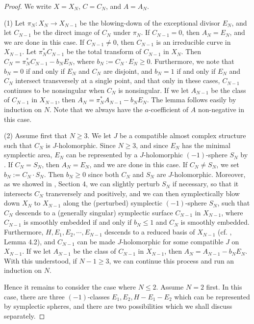 \documentclass[11pt]{amsart}
\theoremstyle{plain}
\numberwithin{theorem}{section}
\theoremstyle{definition}
\begin{document}
\begin{proof}
We write $X=X_N$, $C=C_N$, and $A=A_N$.

(1) Let $\pi_N: X_N\rightarrow X_{N-1}$ be the blowing-down of 
the exceptional divisor $E_N$, and let $C_{N-1}$ be the direct image of $C_N$ under $\pi_N$. If $C_{N-1}=0$, then $A_N=E_N$, and we are done in this case. If $C_{N-1}\neq 0$, then 
$C_{N-1}$ is an irreducible curve in $X_{N-1}$. Let $\pi_N^\ast C_{N-1}$ be the total transform of
$C_{N-1}$ in $X_N$. Then $C_N=\pi_N^\ast C_{N-1}-b_N E_N$, where $b_N:=C_N\cdot E_N\geq 0$.
Furthermore, we note that $b_N=0$ if and only if $E_N$ and $C_N$ are disjoint, and $b_N=1$ if and only if $E_N$ and $C_N$ intersect transversely at a single point, and that only in these cases,
$C_{N-1}$ continues to be nonsingular when $C_N$ is nonsingular. If we let $A_{N-1}$ be the class of $C_{N-1}$
in $X_{N-1}$, then $A_N=\pi_N^\ast A_{N-1}-b_N E_N$. The lemma follows easily by induction on $N$. Note that we always have the $a$-coefficient of $A$ non-negative in this case. 

(2) Assume first that $N\geq 3$. We let $J$ be a compatible almost complex structure such that $C_N$ is $J$-holomorphic. Since $N\geq 3$, and since $E_N$ has the minimal symplectic area, $E_N$ can be represented by a $J$-holomorphic $(-1)$-sphere $S_N$ by \cite{KK}. If $C_N=S_N$, then $A_N=E_N$, and we are done in this case. If $C_N\neq S_N$, we set $b_N:=C_N\cdot S_N$. Then $b_N\geq 0$ since both $C_N$ and $S_N$ are $J$-holomorphic. Moreover, as we showed in \cite{C1}, Section 4, we can slightly perturb $S_N$ if necessary, so that it intersects $C_N$ transversely and positively, and we can then symplectically blow down $X_N$ to $X_{N-1}$ along the (perturbed) symplectic $(-1)$-sphere $S_N$, such that $C_N$ descends to a (generally singular) symplectic surface $C_{N-1}$ in $X_{N-1}$, where $C_{N-1}$ is smoothly embedded if and only if $b_N\leq 1$ and $C_N$ is smoothly embedded. Furthermore, $H, E_1,E_2, \cdots, E_{N-1}$ descends to a reduced basis of $X_{N-1}$ (cf. \cite{C1}, Lemma 4.2), and $C_{N-1}$ can be made $J$-holomorphic for some compatible $J$ on $X_{N-1}$. 
If we let $A_{N-1}$ be the class of $C_{N-1}$ in $X_{N-1}$, then $A_N=A_{N-1}-b_N E_N$.
With this understood, if $N-1\geq 3$, we can continue this process and run an induction on $N$. 

Hence it remains to consider the case where $N\leq 2$. Assume $N=2$ first. In this case, there are
three $(-1)$-classes $E_1,E_2, H-E_1-E_2$ which can be represented by symplectic spheres, and 
there are two possibilities which we shall discuss separately. 


\end{proof}
\end{document}
